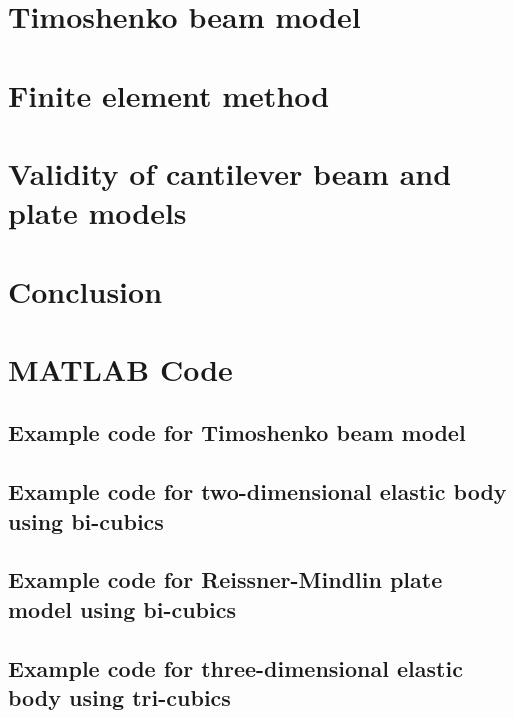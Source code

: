 \documentclass[12pt]{report}
\begin{document}
\chapter{Timoshenko beam model}\label{ch:timoshenko-beam-model}




% 



\chapter{Finite element method}\label{ch:finite-element-method}




\chapter{Validity of cantilever beam and plate models}\label{ch:validity-of-cantilever-beam-and-plate-models}

% 



\chapter{Conclusion}\label{ch:conclusion}




\printbibliography[heading=bibintoc, category=cited, title={Bibliography}]
\printbibliography[heading=bibintoc, notcategory=cited, title={Secondary Bibliography}]

\chapter*{MATLAB Code}
\section*{Example code for Timoshenko beam model}


\section*{Example code for two-dimensional elastic body using bi-cubics}


\section*{Example code for Reissner-Mindlin plate model using bi-cubics}


\section*{Example code for three-dimensional elastic body using tri-cubics}

\end{document}
